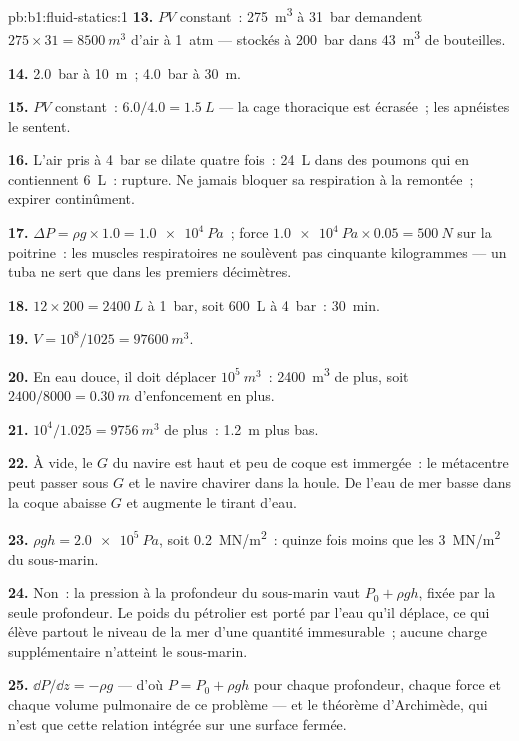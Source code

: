 \begin{solution}{pb:b1:fluid-statics:1}
\textbf{13.} $PV$ constant~: \qty{275}{m^3} à \qty{31}{bar} demandent $275 \times 31
= \qty{8500}{m^3}$ d'air à \qty{1}{atm} --- stockés à \qty{200}{bar} dans
\qty{43}{m^3} de bouteilles.

\textbf{14.} \qty{2.0}{bar} à \qty{10}{m}~; \qty{4.0}{bar} à \qty{30}{m}.

\textbf{15.} $PV$ constant~: $6.0/4.0 = \qty{1.5}{L}$ --- la cage thoracique est
écrasée~; les apnéistes le sentent.

\textbf{16.} L'air pris à \qty{4}{bar} se dilate quatre fois~: \qty{24}{L} dans des
poumons qui en contiennent \qty{6}{L}~: rupture. Ne jamais bloquer sa respiration
à la remontée~; expirer continûment.

\textbf{17.} $\Delta P = \rho g \times 1.0 = \qty{1.0e4}{Pa}$~; force $\qty{1.0e4}{Pa}
\times 0.05 = \qty{500}{N}$ sur la poitrine~: les muscles respiratoires ne
soulèvent pas cinquante kilogrammes --- un tuba ne sert que dans les premiers décimètres.

\textbf{18.} $12 \times 200 = \qty{2400}{L}$ à \qty{1}{bar}, soit \qty{600}{L}
à \qty{4}{bar}~: \qty{30}{min}.

\textbf{19.} $V = 10^8/1025 = \qty{97600}{m^3}$.

\textbf{20.} En eau douce, il doit déplacer $10^5\ \unit{m^3}$~: \qty{2400}{m^3}
de plus, soit $2400/8000 = \qty{0.30}{m}$ d'enfoncement en plus.

\textbf{21.} $10^4/1.025 = \qty{9756}{m^3}$ de plus~: \qty{1.2}{m} plus bas.

\textbf{22.} À vide, le $G$ du navire est haut et peu de coque est immergée~:
le métacentre peut passer sous $G$ et le navire chavirer dans la houle. De
l'eau de mer basse dans la coque abaisse $G$ et augmente le tirant d'eau.

\textbf{23.} $\rho gh = \qty{2.0e5}{Pa}$, soit \qty{0.2}{MN/m^2}~: quinze fois moins
que les \qty{3}{MN/m^2} du sous-marin.

\textbf{24.} Non~: la pression à la profondeur du sous-marin vaut $P_0 + \rho gh$,
fixée par la seule profondeur. Le poids du pétrolier est porté par l'eau qu'il
déplace, ce qui élève partout le niveau de la mer d'une quantité immesurable~;
aucune charge supplémentaire n'atteint le sous-marin.

\textbf{25.} $\dd P/\dd z = -\rho g$ --- d'où $P = P_0 + \rho gh$ pour chaque
profondeur, chaque force et chaque volume pulmonaire de ce problème --- et le
théorème d'Archimède, qui n'est que cette relation intégrée sur une surface fermée.
\end{solution}
